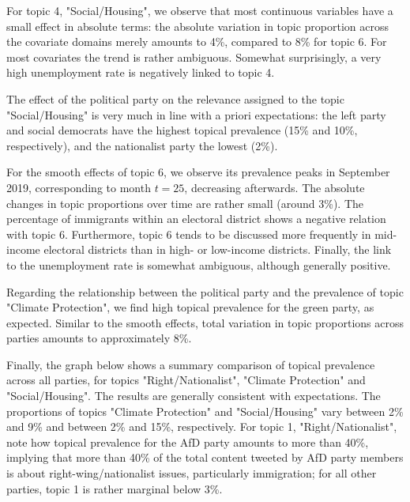 For topic 4, "Social/Housing", we observe that most continuous variables have a small effect in absolute terms: the absolute variation in topic proportion across the covariate domains merely amounts to 4\%, compared to 8\% for topic 6. For most covariates the trend is rather ambiguous. Somewhat surprisingly, a very high unemployment rate is negatively linked to topic 4.

The effect of the political party on the relevance assigned to the topic "Social/Housing" is very much in line with a priori expectations: the left party and social democrats have the highest topical prevalence (15\% and 10\%, respectively), and the nationalist party the lowest (2\%).

For the smooth effects of topic 6, we observe its prevalence peaks in September 2019, corresponding to month $t=25$, decreasing afterwards. The absolute changes in topic proportions over time are rather small (around 3\%). The percentage of immigrants within an electoral district shows a negative relation with topic 6. Furthermore, topic 6 tends to be discussed more frequently in mid-income electoral districts than in high- or low-income districts. Finally, the link to the unemployment rate is somewhat ambiguous, although generally positive.

Regarding the relationship between the political party and the prevalence of topic "Climate Protection", we find high topical prevalence for the green party, as expected. Similar to the smooth effects, total variation in topic proportions across parties amounts to approximately 8\%.

Finally, the graph below shows a summary comparison of topical prevalence across all parties, for topics "Right/Nationalist", "Climate Protection" and "Social/Housing". The results are generally consistent with expectations. The proportions of topics "Climate Protection" and "Social/Housing" vary between 2\% and 9\% and between 2\% and 15\%, respectively. For topic 1, "Right/Nationalist", note how topical prevalence for the AfD party amounts to more than 40\%, implying that more than 40\% of the total content tweeted by AfD party members is about right-wing/nationalist issues, particularly immigration; for all other parties, topic 1 is rather marginal below 3\%.

